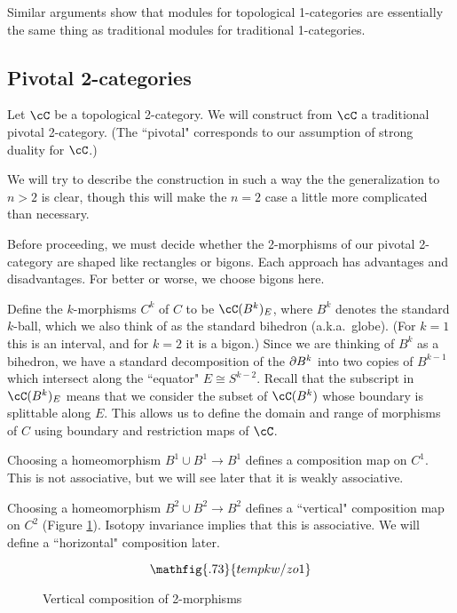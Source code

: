\medskip

Similar arguments show that modules for topological 1-categories are essentially
the same thing as traditional modules for traditional 1-categories.


\subsection{Pivotal 2-categories}
\label{ssec:2-cats}
Let $\cC$ be a topological 2-category.
We will construct from $\cC$ a traditional pivotal 2-category.
(The ``pivotal" corresponds to our assumption of strong duality for $\cC$.)

We will try to describe the construction in such a way the the generalization to $n>2$ is clear,
though this will make the $n=2$ case a little more complicated than necessary.

Before proceeding, we must decide whether the 2-morphisms of our
pivotal 2-category are shaped like rectangles or bigons.
Each approach has advantages and disadvantages.
For better or worse, we choose bigons here.

Define the $k$-morphisms $C^k$ of $C$ to be $\cC(B^k)_E$, where $B^k$ denotes the standard
$k$-ball, which we also think of as the standard bihedron (a.k.a.\ globe).
(For $k=1$ this is an interval, and for $k=2$ it is a bigon.)
Since we are thinking of $B^k$ as a bihedron, we have a standard decomposition of the $\partial B^k$
into two copies of $B^{k-1}$ which intersect along the ``equator" $E \cong S^{k-2}$.
Recall that the subscript in $\cC(B^k)_E$ means that we consider the subset of $\cC(B^k)$
whose boundary is splittable along $E$.
This allows us to define the domain and range of morphisms of $C$ using
boundary and restriction maps of $\cC$.

Choosing a homeomorphism $B^1\cup B^1 \to B^1$ defines a composition map on $C^1$.
This is not associative, but we will see later that it is weakly associative.

Choosing a homeomorphism $B^2\cup B^2 \to B^2$ defines a ``vertical" composition map 
on $C^2$ (Figure \ref{fzo1}).
Isotopy invariance implies that this is associative.
We will define a ``horizontal" composition later.

\begin{figure}[t]
\begin{equation*}
\mathfig{.73}{tempkw/zo1}
\end{equation*}
\caption{Vertical composition of 2-morphisms}
\label{fzo1}
\end{figure}

